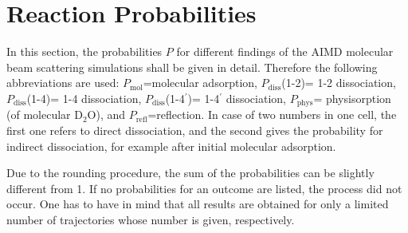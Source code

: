 \documentclass[11pt,DIV=13,BCOR=5mm,a4paper,headinclude]{scrbook}
\begin{document}
\def\thetable{C.\arabic{table}}

\section{Reaction Probabilities}\label{reactionprobabilities}
In this section, the probabilities $P$ for different findings of the AIMD molecular beam scattering simulations shall be given in detail.
Therefore the following abbreviations are used: $P_\textrm{mol}$=molecular adsorption, 
 $P_\textrm{diss}$(1-2)= 1-2 dissociation, $P_\textrm{diss}$(1-4)= 1-4 dissociation, $P_\textrm{diss}$(1-4$^\prime$)= 1-4$^\prime$ dissociation, $P_\textrm{phys}$= physisorption (of molecular D$_2$O), and $P_\textrm{refl}$=reflection.
In case of two numbers in one cell, the first one refers to direct dissociation, and the second gives the probability for indirect dissociation, for example after initial molecular adsorption.


Due to the rounding procedure, the sum of the probabilities can be slightly different from 1.
If no probabilities for an outcome are listed, the process did not occur.
One has to have in mind that all results are obtained for only a limited number of trajectories whose number is given, respectively.
\end{document}
